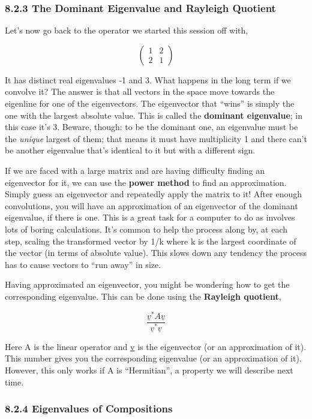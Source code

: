 \documentclass[oneside,english]{amsbook}
\numberwithin{section}{chapter}
\theoremstyle{plain}
\theoremstyle{definition}
\begin{document}
\subsubsection{8.2.3 The Dominant Eigenvalue and Rayleigh
	Quotient}\label{the-dominant-eigenvalue-and-rayleigh-quotient}

Let's now go back to the operator we started this session off with,

\[\begin{pmatrix}
	1 & 2 \\
	2 & 1
\end{pmatrix}\]

It has distinct real eigenvalues -1 and 3. What happens in the long term
if we convolve it? The answer is that all vectors in the space move
towards the eigenline for one of the eigenvectors. The eigenvector that
``wins'' is simply the one with the largest absolute value. This is
called the \textbf{dominant eigenvalue}; in this case it's 3. Beware,
though: to be the dominant one, an eigenvalue must be the \emph{unique}
largest of them; that means it must have multiplicity 1 and there can't
be another eigenvalue that's identical to it but with a different sign.

If we are faced with a large matrix and are having difficulty finding an
eigenvector for it, we can use the \textbf{power method} to find an
approximation. Simply guess an eigenvector and repeatedly apply the
matrix to it! After enough convolutions, you will have an approximation
of an eigenvector of the dominant eigenvalue, if there is one. This is a
great task for a computer to do as involves lots of boring calculations.
It's common to help the process along by, at each step, scaling the
transformed vector by 1/k where k is the largest coordinate of the
vector (in terms of absolute value). This slows down any tendency the
process has to cause vectors to ``run away'' in size.

Having approximated an eigenvector, you might be wondering how to get
the corresponding eigenvalue. This can be done using the
\textbf{Rayleigh quotient},

\[\frac{{\underline{v}}^{*}A\underline{v}}{{\underline{v}}^{*}\underline{v}}\]

Here A is the linear operator and \ul{v} is the eigenvector (or an
approximation of it). This number gives you the corresponding eigenvalue
(or an approximation of it). However, this only works if A is
``Hermitian'', a property we will describe next time.

\subsubsection{8.2.4 Eigenvalues of
	Compositions}\label{eigenvalues-of-compositions}
\end{document}

